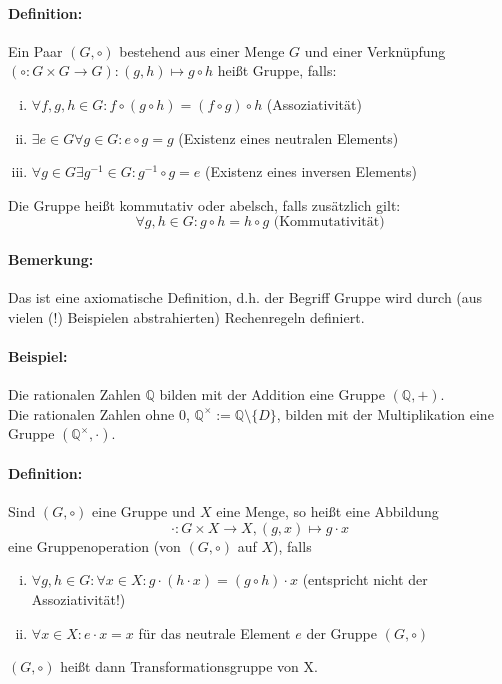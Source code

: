 \documentclass[12pt,a4paper,parskip=half-,DIV=15]{scrreprt}
\begin{document}
\paragraph{Definition:} Ein Paar $(G,\circ)$ bestehend aus einer Menge $G$ und einer Verknüpfung $(\circ : G\times G \to G) : (g,h) \mapsto g \circ h$ heißt Gruppe, falls:

\begin{enumerate}[(i)]
\item $\forall f,g,h\in G : f\circ (g\circ h) = (f\circ g)\circ h$ (Assoziativität)
\item $\exists e\in G\forall g\in G : e\circ g = g$ (Existenz eines neutralen Elements)
\item $\forall g \in G \exists g^{-1} \in G : g^{-1}\circ g = e$ (Existenz eines inversen Elements)
\end{enumerate}

Die Gruppe heißt kommutativ oder abelsch, falls zusätzlich gilt:
\begin{equation*}
\forall g,h\in G: g\circ h = h\circ g \text{ (Kommutativität)}
\end{equation*}

\paragraph{Bemerkung:} Das ist eine axiomatische Definition, d.h. der Begriff \glqq Gruppe\grqq{} wird durch (aus vielen (!) Beispielen abstrahierten) \glqq Rechenregeln\grqq{} definiert.
\paragraph{Beispiel:} Die rationalen Zahlen $\mathbb{Q}$ bilden mit der Addition eine Gruppe $(\mathbb{Q} ,+)$.\\
Die rationalen Zahlen ohne $0$, $\mathbb{Q}^{\times} := \mathbb{Q}\setminus \{D\}$, bilden mit der Multiplikation eine Gruppe $(\mathbb{Q}^\times ,\cdot)$.

\paragraph{Definition:} Sind $(G,\circ )$ eine Gruppe und $X$ eine Menge, so heißt eine Abbildung
\begin{equation*}\cdot : G\times X\to X, (g,x)\mapsto g\cdot x\end{equation*}
eine Gruppenoperation (von $(G,\circ )$ auf $X$), falls
\begin{enumerate}[(i)]
\item $\forall g,h\in G :\forall x\in X: g\cdot (h\cdot x) = (g\circ h)\cdot x$ (entspricht nicht der Assoziativität!)
\item $\forall x\in X: e\cdot x = x$ für das neutrale Element $e$ der Gruppe $(G,\circ )$
\end{enumerate}
$(G,\circ )$ heißt dann Transformationsgruppe von X.
\end{document}

